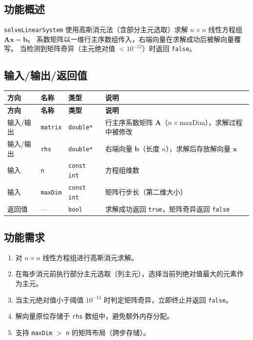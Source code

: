 \documentclass[a4paper,10pt]{article}
\begin{document}
\subsection{功能概述}

\texttt{solveLinearSystem} 使用高斯消元法（含部分主元选取）求解 $n \times n$ 线性方程组 $\mathbf{A}\mathbf{x} = \mathbf{b}$。
系数矩阵以一维行主序数组传入，右端向量在求解成功后被解向量覆写。
当检测到矩阵奇异（主元绝对值 $< 10^{-12}$）时返回 \texttt{false}。

\subsection{输入/输出/返回值}

\renewcommand{\arraystretch}{1.3}
\begin{longtable}{|L{2.2cm}|L{3cm}|C{2.5cm}|L{7cm}|}
\hline
\textbf{方向} & \textbf{名称} & \textbf{类型} & \textbf{说明} \\
\hline
\endfirsthead
\hline
\textbf{方向} & \textbf{名称} & \textbf{类型} & \textbf{说明} \\
\hline
\endhead
输入/输出 & \texttt{matrix} & \texttt{double*} & 行主序系数矩阵 $\mathbf{A}$（$n \times \text{maxDim}$），求解过程中被修改 \\
\hline
输入/输出 & \texttt{rhs} & \texttt{double*} & 右端向量 $\mathbf{b}$（长度 $n$），求解后存放解向量 $\mathbf{x}$ \\
\hline
输入 & \texttt{n} & \texttt{const int} & 方程组维数 \\
\hline
输入 & \texttt{maxDim} & \texttt{const int} & 矩阵行步长（第二维大小） \\
\hline
返回值 & --- & \texttt{bool} & 求解成功返回 \texttt{true}，矩阵奇异返回 \texttt{false} \\
\hline
\end{longtable}

\subsection{功能需求}

\begin{enumerate}[label=FR-\arabic*]
  \item 对 $n \times n$ 线性方程组进行高斯消元求解。
  \item 在每步消元前执行部分主元选取（列主元），选择当前列绝对值最大的元素作为主元。
  \item 当主元绝对值小于阈值 $10^{-12}$ 时判定矩阵奇异，立即终止并返回 \texttt{false}。
  \item 解向量原位存储于 \texttt{rhs} 数组中，避免额外内存分配。
  \item 支持 \texttt{maxDim} $>$ \texttt{n} 的矩阵布局（跨步存储）。
\end{enumerate}
\end{document}
